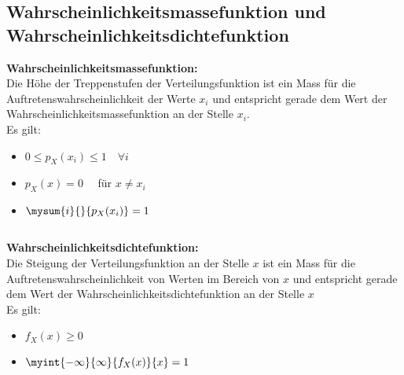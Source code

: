 		\subsection{Wahrscheinlichkeitsmassefunktion und Wahrscheinlichkeitsdichtefunktion}
			\begin{minipage}{0.49\textwidth}
				\textbf{Wahrscheinlichkeitsmassefunktion:}\\[0.2cm]
					Die Höhe der Treppenstufen der Verteilungsfunktion ist ein Mass für die Auftretenswahrscheinlichkeit der Werte $x_i$ und entspricht gerade dem Wert der Wahrscheinlichkeitsmassefunktion an der Stelle $x_i$.\\[0.2cm]
					Es gilt:$\quad$\\[0.2cm]
					\begin{itemize}
						\item $0\leq p_X(x_i)\leq 1 \quad\forall i$\\[-0.35cm]
						\item $p_X(x)= 0 \quad$ für $x\neq x_i$\\[-0.35cm]
						\item $\mysum{i}{}{p_X(x_i)}=1$
					\end{itemize}
			\end{minipage}\begin{minipage}{0.02\textwidth}$ $\end{minipage}
			\begin{minipage}{0.49\textwidth}
				\textbf{Wahrscheinlichkeitsdichtefunktion:}\\[0.2cm]
					Die Steigung der Verteilungsfunktion an der Stelle $x$ ist ein Mass für die Auftretenswahrscheinlichkeit von Werten im Bereich von $x$ und entspricht gerade dem Wert der Wahrscheinlichkeitsdichtefunktion an der Stelle $x$\\[0.2cm]
					Es gilt: $\quad$$\quad$\\[0.2cm]
					\begin{itemize}
						\item $f_X(x)\geq 0 $\\[-0.35cm]
						\item $\myint{-\infty}{\infty}{f_X(x)}{x}=1$
					\end{itemize}

			\end{minipage}	

